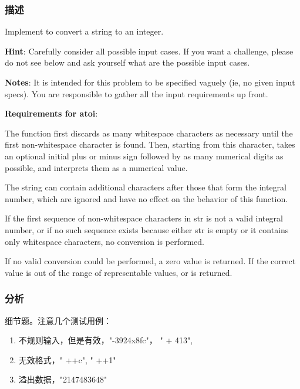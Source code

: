 \subsubsection{描述}
Implement  to convert a string to an integer.

\textbf{Hint}: Carefully consider all possible input cases. If you want a challenge, please do not see below and ask yourself what are the possible input cases.

\textbf{Notes}: It is intended for this problem to be specified vaguely (ie, no given input specs). You are responsible to gather all the input requirements up front.

\textbf{Requirements for atoi}:

The function first discards as many whitespace characters as necessary until the first non-whitespace character is found. Then, starting from this character, takes an optional 
initial plus or minus sign followed by as many numerical digits as possible, and interprets them as a numerical value.

The string can contain additional characters after those that form the integral number, which are ignored and have no effect on the behavior of this function.

If the first sequence of non-whitespace characters in str is not a valid integral number, or if no such sequence exists because either str is empty or it contains only whitespace 
characters, no conversion is performed.

If no valid conversion could be performed, a zero value is returned. If the correct value is out of the range of representable values,  or  is returned.

\subsubsection{分析}
细节题。注意几个测试用例：
\begin{enumerate}
	\item 不规则输入，但是有效，"-3924x8fc"， "  +  413",
	\item 无效格式，" ++c", " ++1"
	\item 溢出数据，"2147483648"
\end{enumerate}

